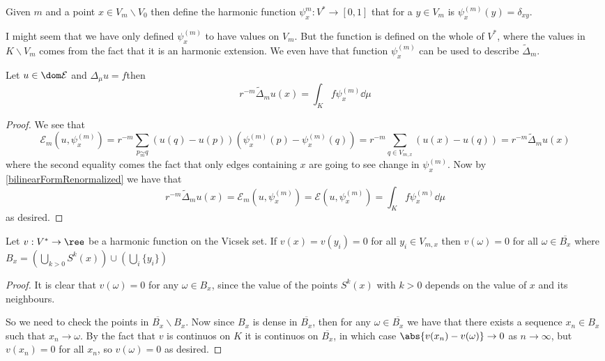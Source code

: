 \begin{defi}
	Given $m$ and a point $x \in V_m \backslash V_0$ then define the harmonic function $\psi_{x}^{m}: V^{*} \to [0,1]$ that for a $y \in V_m$ is $\psi_x^{(m)}(y) = \delta_{xy}$.
\end{defi}
I might seem that we have only defined $\psi_x^{(m)}$ to have values on $V_m$. But the function is defined on the whole of $V^{*}$, where the values in $K \backslash V_m$ comes from the fact that it is an harmonic extension. We even have that function $\psi_x^{(m)}$ can be used to describe $\widetilde{\Delta}_{m}$.
\begin{prop}\label{pointwiseEqualityofpsi}
	Let $u \in \dom \mathcal{E}$ and $\Delta_{\mu}u = f$then
	\begin{equation}
		r^{-m}\widetilde{\Delta}_{m}u(x) = \int_{K}f \psi_{x}^{(m)} \dd \mu
	\end{equation}
\end{prop}
\begin{proof}
	We see that
	\begin{equation}
		\mathcal{E}_{m}(u, \psi_{x}^{(m)}) = r^{-m} \sum_{p \underset{m}{\sim} q}(u(q)-u(p))(\psi_{x}^{(m)}(p) -\psi_{x}^{(m)}(q)) = r^{-m}\sum_{q \in V_{m,x}}(u(x)-u(q)) = r^{-m}\widetilde{\Delta}_{m}u(x)
	\end{equation}
	where the second equality comes the fact that only edges containing $x$ are going to see change in $\psi_{x}^{(m)}$. Now by \eqref{bilinearFormRenormalized} we have that
	\begin{equation}
		r^{-m}\widetilde{\Delta}_{m}u(x) = \mathcal{E}_{m}(u, \psi_{x}^{(m)}) = \mathcal{E}(u, \psi_{x}^{(m)}) = \int_{K}f \psi_{x}^{(m)} \dd \mu
	\end{equation}
	as desired.
\end{proof}

\begin{lemma}\label{itIsZero}
	Let $v: V^{*} \to \ree$ be a harmonic function on the Vicsek set. If $v(x) = v(y_i) = 0$ for all $y_i \in V_{m,x}$ then $v(\omega) = 0$ for all $\omega \in \overline{B_x}$ where $B_x = \left( \bigcup_{k > 0} S^{k}(x) \right) \cup \left(\bigcup_{i} \{y_i\} \right)$
\end{lemma}
\begin{proof}
	It is clear that $v(\omega) = 0$ for any $\omega \in B_x$, since the value of the points $S^{k}(x)$ with $k > 0$ depends on the value of $x$ and its neighbours. 
	
	So we need to check the points in $\overline{B_x} \backslash B_x$. Now since $B_x$ is dense in $\overline{B_x}$, then for any $\omega \in \overline{B_x}$ we have that there exists a sequence $x_n \in B_x$ such that $x_n \to \omega$. By the fact that $v$ is continuos on $K$ it is continuos on $\overline{B_x}$, in which case $\abs{v(x_n) - v(\omega)} \to 0$ as $n \to \infty$, but $v(x_n) = 0$ for all $x_n$, so $v(\omega) = 0$ as desired.  
\end{proof}

